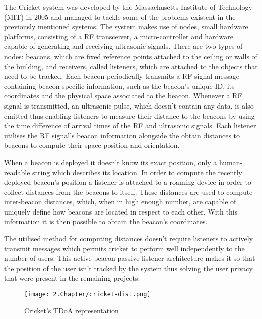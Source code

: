 \label{subsec:cricket}

The Cricket system \cite{cricket}was developed by the Massachusetts Institute of Technology (MIT) in 2005 and managed to tackle some of the problems existent in the previously mentioned systems. The system makes use of nodes, small hardware platforms, consisting of a RF transceiver, a micro-controller and hardware capable of generating and receiving ultrasonic signals. There are two types of nodes: beacons, which are fixed reference points attached to the ceiling or walls of the building, and receivers, called listeners, which are attached to the objects that need to be tracked. Each beacon periodically transmits a \ac{RF} signal message containing beacon specific information, such as the beacon's unique ID, its coordinates and the physical space associated to the beacon. Whenever a \ac{RF} signal is transmitted, an ultrasonic pulse, which doesn't contain any data, is also emitted thus enabling listeners to measure their distance to the beacons by using the time difference of arrival times of the RF and ultrasonic signals. Each listener utilises the RF signal's beacon information alongside the obtain distances to beacons to compute their space position and orientation. 

When a beacon is deployed it doesn't know its exact position, only a human-readable string which describes its location. In order to compute the recently deployed beacon's position a listener is attached to a roaming device in order to collect distances from the beacons to itself. These distances are used to compute inter-beacon distances, which, when in high enough number, are capable of uniquely define how beacons are located in respect to each other. With this information it is then possible to obtain the beacon's coordinates.

The utilised method for computing distances doesn't require listeners to actively transmit messages which permits cricket to perform well independently to the number of users. This active-beacon passive-listener architecture makes it so that the position of the user isn't tracked by the system thus solving the user privacy that were present in the remaining projects.

\begin{figure}[H]
	\centering
		\texttt{[image: 2.Chapter/cricket-dist.png]}
	\caption[Cricket's \ac{TDoA} representation]{Cricket's \ac{TDoA} representation}
	\label{fig:cricket-tdoa}
\end{figure}

